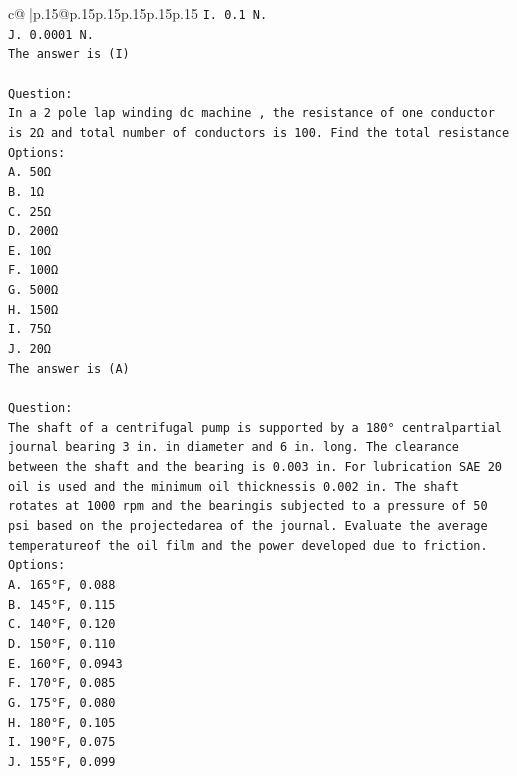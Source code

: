 \documentclass{article}
\begin{document}
{\begin{supertabular}{c@{$\;$}|p{.15\linewidth}@{}p{.15\linewidth}p{.15\linewidth}p{.15\linewidth}p{.15\linewidth}p{.15\linewidth}}
{{{\texttt{I. 0.1 N.} \\
\texttt{J. 0.0001 N.} \\
\texttt{The answer is (I)} \\
\\ 
\texttt{Question:} \\
\texttt{In a 2 pole lap winding dc machine , the resistance of one conductor is 2Ω and total number of conductors is 100. Find the total resistance} \\
\texttt{Options:} \\
\texttt{A. 50Ω} \\
\texttt{B. 1Ω} \\
\texttt{C. 25Ω} \\
\texttt{D. 200Ω} \\
\texttt{E. 10Ω} \\
\texttt{F. 100Ω} \\
\texttt{G. 500Ω} \\
\texttt{H. 150Ω} \\
\texttt{I. 75Ω} \\
\texttt{J. 20Ω} \\
\texttt{The answer is (A)} \\
\\ 
\texttt{Question:} \\
\texttt{The shaft of a centrifugal pump is supported by a 180° centralpartial journal bearing 3 in. in diameter and 6 in. long. The clearance between the shaft and the bearing is 0.003 in. For lubrication SAE 20 oil is used and the minimum oil thicknessis 0.002 in. The shaft rotates at 1000 rpm and the bearingis subjected to a pressure of 50 psi based on the projectedarea of the journal. Evaluate the average temperatureof the oil film and the power developed due to friction.} \\
\texttt{Options:} \\
\texttt{A. 165°F, 0.088} \\
\texttt{B. 145°F, 0.115} \\
\texttt{C. 140°F, 0.120} \\
\texttt{D. 150°F, 0.110} \\
\texttt{E. 160°F, 0.0943} \\
\texttt{F. 170°F, 0.085} \\
\texttt{G. 175°F, 0.080} \\
\texttt{H. 180°F, 0.105} \\
\texttt{I. 190°F, 0.075} \\
\texttt{J. 155°F, 0.099} \\
            }
        }
    }
     \\ \\


\end{supertabular}}
\end{document}
